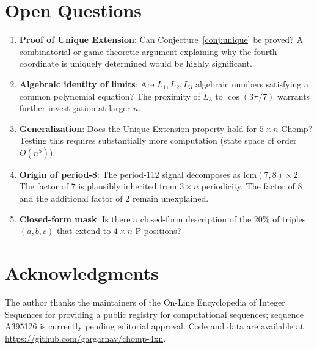 \documentclass[12pt]{article}
\begin{document}
\section{Open Questions}

\begin{enumerate}
  \item \textbf{Proof of Unique Extension}: Can Conjecture~\ref{conj:unique}
        be proved? A combinatorial or game-theoretic argument explaining
        why the fourth coordinate is uniquely determined would be highly
        significant.

  \item \textbf{Algebraic identity of limits}: Are $L_1, L_2, L_3$
        algebraic numbers satisfying a common polynomial equation?
        The proximity of $L_3$ to $\cos(3\pi/7)$ warrants further
        investigation at larger $n$.

  \item \textbf{Generalization}: Does the Unique Extension property hold
        for $5 \times n$ Chomp? Testing this requires substantially more
        computation (state space of order $O(n^5)$).

  \item \textbf{Origin of period-8}: The period-112 signal decomposes
        as $\mathrm{lcm}(7,8) \times 2$. The factor of 7 is plausibly
        inherited from $3 \times n$ periodicity. The factor of 8 and the
        additional factor of 2 remain unexplained.

  \item \textbf{Closed-form mask}: Is there a closed-form description
        of the 20\% of triples $(a,b,c)$ that extend to $4 \times n$
        P-positions?
\end{enumerate}

\section*{Acknowledgments}

The author thanks the maintainers of the On-Line Encyclopedia of Integer
Sequences for providing a public registry for computational sequences;
sequence A395126 is currently pending editorial approval.
Code and data are available at
\url{https://github.com/gargarnav/chomp-4xn}.
\end{document}

